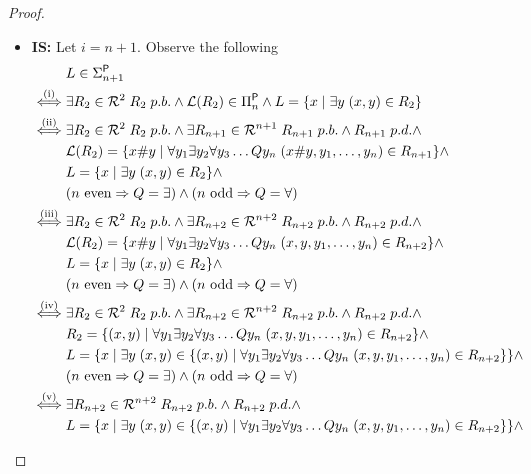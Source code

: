 \documentclass [11pt]{article}
\newcommand{\ccfont}[1]{\protect\mathsf{#1}}
\newcommand{\Ptime}{\ccfont{P}}
\newcommand{\phs}[1]{\Sigma_{#1}^{\Ptime}}
\newcommand{\php}[1]{\Pi_{#1}^{\Ptime}}
\newcommand{\sto}{\Rightarrow}
\begin{document}
\begin{proof}
\begin{itemize}
\item \textbf{IS:} Let $i=n+1$. Observe the following
\begin{equation*}
\begin{split}
&L \in \phs{n+1}\\
\stackrel{\text{(i)}}{\iff}& \exists R_2 \in \mathcal{R}^{2} \; R_2 \; p.b.  \land \mathcal{L}(R_2) \in \php{n} \land L = \{x \mid \exists y \; (x,y) \in R_2\} \\
\stackrel{\text{(ii)}}{\iff} &\exists R_2 \in \mathcal{R}^{2} \; R_2 \; p.b.  \land  \exists R_{n+1}  \in  \mathcal{R}^{n+1} \; R_{n+1} \; p.b. \land R_{n+1} \; p.d. \land  \\
&\mathcal{L}(R_2) = \{x\#y \mid \forall y_1 \exists y_2\forall y_3\dots Q y_n  \; (x\#y,y_1,\ldots,y_n) \in R_{n+1}\}  \land \\
& L = \{x \mid \exists y \; (x,y) \in R_2\}  \land \\
&  (n \text{ even}  \sto Q=\exists )\land (n \text{ odd}  \sto Q=\forall )\\
\stackrel{\text{(iii)}}{\iff} &\exists R_2 \in \mathcal{R}^{2} \; R_2 \; p.b.  \land  \exists R_{n+2}  \in  \mathcal{R}^{n+2} \; R_{n+2} \; p.b. \land R_{n+2} \; p.d. \land  \\
&\mathcal{L}(R_2) = \{x\#y \mid \forall y_1 \exists y_2\forall y_3\dots Q y_n  \; (x,y,y_1,\ldots,y_n) \in R_{n+2}\}  \land \\ 
& L = \{x \mid \exists y \; (x,y) \in R_2\} \land  \\ 
&  (n \text{ even}  \sto Q=\exists )\land (n \text{ odd}  \sto Q=\forall )\\
\stackrel{\text{(iv)}}{\iff} &\exists R_2 \in \mathcal{R}^{2} \; R_2 \; p.b.  \land  \exists R_{n+2}  \in  \mathcal{R}^{n+2} \; R_{n+2} \; p.b. \land R_{n+2} \; p.d. \land  \\
&R_2 = \{(x,y) \mid \forall y_1 \exists y_2\forall y_3\dots Q y_n  \; (x,y,y_1,\ldots,y_n) \in R_{n+2}\}  \land\\ 
& L = \{x \mid \exists y \; (x,y) \in  \{(x,y) \mid \forall y_1 \exists y_2\forall y_3\dots Q y_n  \; (x,y,y_1,\ldots,y_n) \in R_{n+2}\}\}  \land  \\ 
&  (n \text{ even}  \sto Q=\exists )\land (n \text{ odd}  \sto Q=\forall )\\
\stackrel{\text{(v)}}{\iff} & \exists R_{n+2}  \in  \mathcal{R}^{n+2} \; R_{n+2} \; p.b. \land R_{n+2} \; p.d. \land  \\
& L = \{x \mid \exists y \; (x,y) \in  \{(x,y) \mid \forall y_1 \exists y_2\forall y_3\dots Q y_n  \; (x,y,y_1,\ldots,y_n) \in R_{n+2}\}\} \land  \\ 

\end{split}
\end{equation*}
\end{itemize}
\end{proof}
\end{document}
